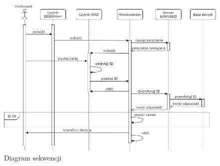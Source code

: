 \begin{figure}[]
        \includegraphics[width=\linewidth]{chapters/images/sequence1.png}
        \caption{Diagram sekwencji}
        \label{fig:sequence1}
\end{figure}

